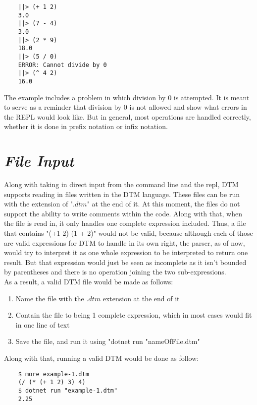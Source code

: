 \documentclass[10pt]{article}
\begin{document}
\begin{verbatim}
    ||> (+ 1 2)
    3.0
    ||> (7 - 4)
    3.0
    ||> (2 * 9)
    18.0
    ||> (5 / 0)
    ERROR: Cannot divide by 0
    ||> (^ 4 2)
    16.0
\end{verbatim}

The example includes a problem in which division by 0 is attempted. It is meant to serve as a reminder that division by 0 is not allowed and show what errors in the REPL would look like. But in general, most operations are handled correctly, whether it is done in prefix notation or infix notation.

\section{\textit{File Input}}

Along with taking in direct input from the command line and the repl, DTM supports reading in files written in the DTM language. These files can be run with the extension of "$.dtm$" at the end of it. At this moment, the files do not support the ability to write comments within the code. Along with that, when the file is read in, it only handles one complete expression included. Thus, a file that contains "(+1 2) (1 + 2)" would not be valid, because although each of those are valid expressions for DTM to handle in its own right, the parser, as of now, would try to interpret it as one whole expression to be interpreted to return one result. But that expression would just be seen as incomplete as it isn't bounded by parentheses and there is no operation joining the two sub-expressions.\\

As a result, a valid DTM file would be made as follows:

\begin{enumerate}
    \item Name the file with the $.dtm$ extension at the end of it
    \item Contain the file to being 1 complete expression, which in most cases would fit in one line of text
    \item Save the file, and run it using "dotnet run "nameOfFile.dtm"
\end{enumerate}

Along with that, running a valid DTM would be done as follow:

\begin{verbatim}
    $ more example-1.dtm 
    (/ (* (+ 1 2) 3) 4)
    $ dotnet run "example-1.dtm"
    2.25
\end{verbatim}
\end{document}
